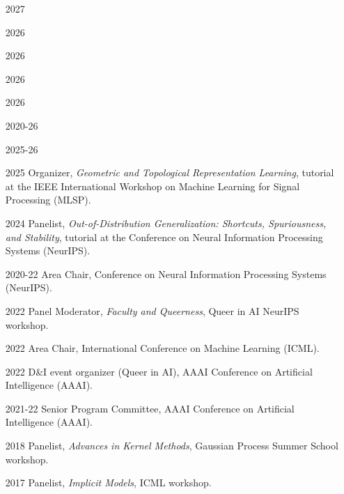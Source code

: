 \documentclass[10pt]{article}
\begin{document}
\begin{itemize}[leftmargin=5em]
  \item[2027] 
  \item[2026] 
  \item[2026] 
  \item[2026] 
  \item[2026] 
  \item[2020-26] 
  \item[2025-26] 
  \item[2025] Organizer, \emph{Geometric and Topological Representation Learning}, tutorial at the IEEE International Workshop on Machine Learning for Signal Processing (MLSP).
  \item[2024] Panelist, \emph{Out-of-Distribution Generalization: Shortcuts, Spuriousness, and Stability}, tutorial at the Conference on Neural Information Processing Systems (NeurIPS).
  \item[2020-22] Area Chair, Conference on Neural Information Processing Systems (NeurIPS).
  \item[2022] {Panel Moderator, \emph{Faculty and Queerness}, Queer in AI NeurIPS workshop.}
  \item[2022] {Area Chair, International Conference on Machine Learning (ICML).}
  \item[2022] {D\&I event organizer (Queer in AI), AAAI Conference on Artificial Intelligence (AAAI).}
  \item[2021-22] {Senior Program Committee, AAAI Conference on Artificial Intelligence (AAAI).}
  \item[2018] Panelist, \emph{Advances in Kernel Methods}, Gaussian Process Summer School workshop.
  \item[2017] Panelist, \emph{Implicit Models}, ICML workshop.
\end{itemize}
\end{document}
